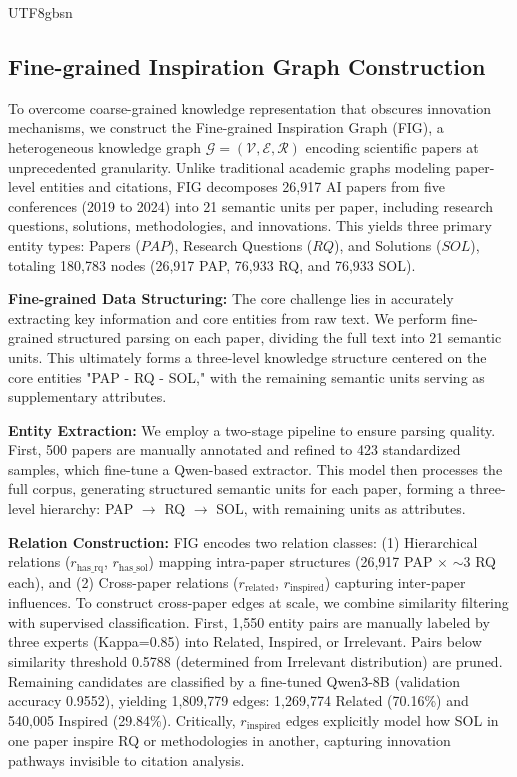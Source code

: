 \documentclass[11pt]{article}
\begin{document}
\begin{CJK}{UTF8}{gbsn}
\subsection{Fine-grained Inspiration Graph Construction}
\label{sec:graph_construction}

To overcome coarse-grained knowledge representation that obscures innovation mechanisms, we construct the Fine-grained Inspiration Graph (FIG), a heterogeneous knowledge graph $\mathcal{G} = (\mathcal{V}, \mathcal{E}, \mathcal{R})$ encoding scientific papers at unprecedented granularity. Unlike traditional academic graphs modeling paper-level entities and citations, FIG decomposes 26,917 AI papers from five conferences (2019 to 2024) into 21 semantic units per paper, including research questions, solutions, methodologies, and innovations. This yields three primary entity types: Papers ($PAP$), Research Questions ($RQ$), and Solutions ($SOL$), totaling 180,783 nodes (26,917 PAP, 76,933 RQ, and 76,933 SOL).

\textbf{Fine-grained Data Structuring:} The core challenge lies in accurately extracting key information and core entities from raw text. We perform fine-grained structured parsing on each paper, dividing the full text into 21 semantic units. This ultimately forms a three-level knowledge structure centered on the core entities "PAP - RQ - SOL," with the remaining semantic units serving as supplementary attributes.

\textbf{Entity Extraction:} We employ a two-stage pipeline to ensure parsing quality. First, 500 papers are manually annotated and refined to 423 standardized samples, which fine-tune a Qwen-based extractor. This model then processes the full corpus, generating structured semantic units for each paper, forming a three-level hierarchy: PAP $\rightarrow$ RQ $\rightarrow$ SOL, with remaining units as attributes.

\textbf{Relation Construction:} FIG encodes two relation classes: (1) Hierarchical relations ($r_{\text{has\_rq}}$, $r_{\text{has\_sol}}$) mapping intra-paper structures (26,917 PAP $\times$ $\sim$3 RQ each), and (2) Cross-paper relations ($r_{\text{related}}$, $r_{\text{inspired}}$) capturing inter-paper influences. To construct cross-paper edges at scale, we combine similarity filtering with supervised classification. First, 1,550 entity pairs are manually labeled by three experts (Kappa=0.85) into Related, Inspired, or Irrelevant. Pairs below similarity threshold 0.5788 (determined from Irrelevant distribution) are pruned. Remaining candidates are classified by a fine-tuned Qwen3-8B (validation accuracy 0.9552), yielding 1,809,779 edges: 1,269,774 Related (70.16\%) and 540,005 Inspired (29.84\%). Critically, $r_{\text{inspired}}$ edges explicitly model how SOL in one paper inspire RQ or methodologies in another, capturing innovation pathways invisible to citation analysis.


\end{CJK}
\end{document}
